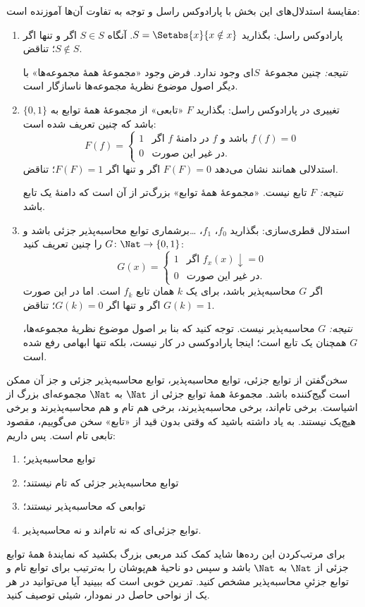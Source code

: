 \documentclass[../../../include/open-logic-section]{subfiles}
\begin{document}

مقایسهٔ استدلال‌های این بخش با پارادوکس راسل و توجه به تفاوت آن‌ها
آموزنده است:
\begin{enumerate}
\item پارادوکس راسل: بگذارید $S=\Setabs{x}{x\notin x}$. آنگاه
  $S\in S$ اگر و تنها اگر $S\notin S$؛ تناقض.

  \emph{نتیجه:} چنین مجموعهٔ~$S$ای وجود ندارد. فرض وجود «مجموعهٔ همهٔ
  مجموعه‌ها» با دیگر اصول موضوع نظریهٔ مجموعه‌ها ناسازگار است.

\item تغییری در پارادوکس راسل: بگذارید $F$ «تابعی» از مجموعهٔ همهٔ
  توابع به $\{0,1\}$ باشد که چنین تعریف شده است:
  \[
  F(f) =
  \begin{cases}
    1 & \text{اگر $f$ در دامنهٔ $f$ باشد و $f(f) = 0$} \\
    0 & \text{در غیر این صورت.}
  \end{cases}
  \]
  استدلالی همانند نشان می‌دهد $F(F)=0$ اگر و تنها اگر $F(F)=1$؛
  تناقض.

  \emph{نتیجه:} $F$ تابع نیست. «مجموعهٔ همهٔ توابع» بزرگ‌تر از آن است
  که دامنهٔ یک تابع باشد.

\item استدلال قطری‌سازی: بگذارید $f_0$، $f_1$، \dots برشماری توابع
  محاسبه‌پذیر جزئی باشد و $G\colon\Nat\to\{0,1\}$ را چنین تعریف کنید:
  \[
  G(x) =
  \begin{cases}
    1 & \text{اگر $f_x(x)\downarrow = 0$} \\
    0 & \text{در غیر این صورت.}
  \end{cases}
  \]
  اگر $G$ محاسبه‌پذیر باشد، برای یک $k$ همان تابع $f_k$ است. اما در
  این صورت $G(k)=1$ اگر و تنها اگر $G(k)=0$؛ تناقض.

  \emph{نتیجه:} $G$ محاسبه‌پذیر نیست. توجه کنید که بنا بر اصول موضوع
  نظریهٔ مجموعه‌ها، $G$ همچنان یک تابع است؛ اینجا پارادوکسی در کار
  نیست، بلکه تنها ابهامی رفع شده است.
\end{enumerate}

سخن‌گفتن از توابع جزئی، توابع محاسبه‌پذیر، توابع محاسبه‌پذیر جزئی و
جز آن ممکن است گیج‌کننده باشد. مجموعهٔ همهٔ توابع جزئی از $\Nat$ به
$\Nat$ مجموعه‌ای بزرگ از اشیاست. برخی تام‌اند، برخی محاسبه‌پذیرند،
برخی هم تام و هم محاسبه‌پذیرند و برخی هیچ‌یک نیستند. به یاد داشته
باشید که وقتی بدون قید از «تابع» سخن می‌گوییم، مقصود تابعی تام است.
پس داریم:
\begin{enumerate}
\item توابع محاسبه‌پذیر؛
\item توابع محاسبه‌پذیر جزئی که تام نیستند؛
\item توابعی که محاسبه‌پذیر نیستند؛
\item توابع جزئی‌ای که نه تام‌اند و نه محاسبه‌پذیر.
\end{enumerate}
برای مرتب‌کردن این رده‌ها شاید کمک کند مربعی بزرگ بکشید که نمایندهٔ
همهٔ توابع جزئی از $\Nat$ به $\Nat$ باشد و سپس دو ناحیهٔ هم‌پوشان
را به‌ترتیب برای توابع تام و توابع جزئیِ محاسبه‌پذیر مشخص کنید.
تمرین خوبی است که ببینید آیا می‌توانید در هر یک از نواحی حاصل در
نمودار، شیئی توصیف کنید.
\end{document}
